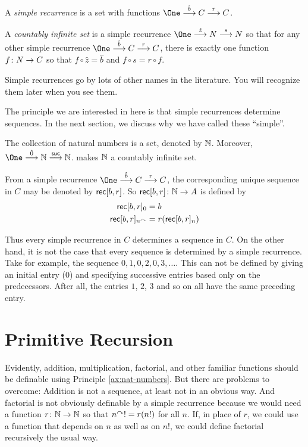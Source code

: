 \begin{defn}\label{def:nno}
	A \emph{simple recurrence} is a set with functions $\One\stackrel{\hat{b}}{\longrightarrow}C\stackrel{r}{\longrightarrow}C$.
	
	A \emph{countably infinite set} is a simple recurrence $\One\stackrel{\hat{z}}{\longrightarrow}N\stackrel{s}{\longrightarrow}N$ so that for any other simple recurrence $\One\stackrel{\hat{b}}{\longrightarrow}C\stackrel{r}{\longrightarrow}C$, there is exactly one function ${f}\colon{N}\to{C}$ so that $f\circ \hat{z} =\hat b$ and $f\circ s = r\circ f$.
	
	Simple recurrences go by lots of other names in the literature. You will recognize them later when you see them.
\end{defn}

The principle we are interested in here is that simple recurrences determine sequences. In the next section, we discuss why we have called these ``simple''.

\begin{principle}\label{ax:nat-numbers}
	The collection of natural numbers is a set, denoted by $\mathbb N$.
	Moreover, $\One \stackrel{\hat{0}}{\longrightarrow} \NN \stackrel{\suc}{\longrightarrow} \NN$.
	makes $\mathbb N$ a countably infinite set.
	
	From a simple recurrence $\One \stackrel{\hat{b}}{\longrightarrow} C \stackrel{r}{\longrightarrow} C$, the corresponding unique sequence in $C$
	may be denoted by $\mathord{\textsf{rec}}[b,r]$. So ${\mathord{\textsf{rec}}[b,r]}\colon{\mathbb N}\to{A}$ is defined by
	\begin{align*}
	\mathord{\textsf{rec}}[b,r]_0 &= b\\
	\mathord{\textsf{rec}}[b,r]_{n^\curvearrowright} &= r(\mathord{\textsf{rec}}[b,r]_n)
	\end{align*}
\end{principle}

Thus every simple recurrence in $C$ determines a sequence in $C$. 
On the other hand, it is not the case that every sequence is determined by a simple recurrence.
Take for example, the sequence $0,1,0,2,0,3,\ldots$. 
This can not be defined by giving an initial entry ($0$) and specifying successive entries based only on the predecessors. 
After all, the entries $1$, $2$, $3$ and so on all have the same preceding entry.

\section{Primitive Recursion}

Evidently, addition, multiplication, factorial, and other familiar functions should be definable using Principle \ref{ax:nat-numbers}. 
But there are problems to overcome: Addition is not a sequence, at least not in an obvious way. And factorial is not obviously definable by a simple recurrence
because we would need a function ${r}\colon{\mathbb N}\to{\mathbb N}$ so that $n^\curvearrowright! = r(n!)$
for all $n$. If, in place of $r$, we could use a function that depends on $n$ as well as on $n!$, we could define factorial recursively the usual way.

